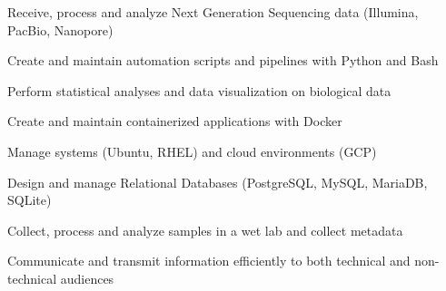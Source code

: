 

\begin{cvskills}

  \begin{minipage}[t]{0.45\textwidth}
    \cvskill
      {Receive, process and analyze Next Generation Sequencing data (Illumina, PacBio, Nanopore)}
  \end{minipage}\hfill
  \begin{minipage}[t]{0.45\textwidth}
    \cvskill
      {Create and maintain automation scripts and pipelines with Python and Bash}
  \end{minipage}

  \begin{minipage}[t]{0.45\textwidth}
   \cvskill
      {Perform statistical analyses and data visualization on biological data}
  \end{minipage}\hfill
  \begin{minipage}[t]{0.45\textwidth}
    \cvskill
      {Create and maintain containerized applications with Docker}
  \end{minipage}

  \begin{minipage}[t]{0.45\textwidth}
    \cvskill
      {Manage systems (Ubuntu, RHEL) and cloud environments (GCP)}
  \end{minipage}\hfill
  \begin{minipage}[t]{0.45\textwidth}
    \cvskill
      {Design and manage Relational Databases (PostgreSQL, MySQL, MariaDB, SQLite)}
  \end{minipage}

  \begin{minipage}[t]{0.45\textwidth}
    \cvskill
      {Collect, process and analyze samples in a wet lab and collect metadata}
  \end{minipage}\hfill
  \begin{minipage}[t]{0.45\textwidth}
    \cvskill
      {Communicate and transmit information efficiently to both technical and non-technical audiences}
  \end{minipage}

\end{cvskills}
